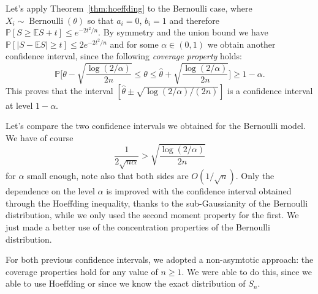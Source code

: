 \documentclass[
	fontsize=11pt, %
	twoside=false, %
	numbers=noenddot, %
]{kaobook}
\DeclareMathOperator{\ber}{Bernoulli}
\renewcommand{\P}{\mathbb P}
\newcommand{\E}{\mathbb E}
\newcommand{\wh}{\widehat}
\begin{document}
Let's apply Theorem~\ref{thm:hoeffding} to the Bernoulli case, where $X_i \sim \ber(\theta)$ so that $a_i = 0$, $b_i = 1$ and therefore $\P[ S \geq \E S + t] \leq e^{-2 t^2 / n}$.
By symmetry and the union bound we have $\P[ | S - \E S | \geq t] \leq 2 e^{-2 t^2 / n}$ and for some $\alpha \in (0, 1)$ we obtain another confidence interval, since the following \emph{coverage property} holds:
\begin{equation*}
	\P \Big[ \theta - \sqrt{\frac{\log(2 / \alpha)}{2n}} \leq \theta \leq \wh \theta 
	+ \sqrt{\frac{\log(2 / \alpha)}{2n}} \Big] \geq 1 - \alpha.
\end{equation*}
This proves that the interval $[\wh \theta \pm \sqrt{\log(2 / \alpha) / (2n)}]$ is a confidence interval at level $1 - \alpha$.

Let's compare the two confidence intervals we obtained for the Bernoulli model.
We have of course
\begin{equation*}
	\frac{1}{2 \sqrt{n \alpha}} > \sqrt{\frac{\log(2 / \alpha)}{2n}} 
\end{equation*}
for $\alpha$ small enough, note also that both sides are $O(1 / \sqrt n)$.
Only the dependence on the level $\alpha$ is improved with the confidence interval obtained through the Hoeffding inequality, thanks to the sub-Gaussianity of the Bernoulli distribution, while we only used the second moment property for the first.
We just made a better use of the concentration properties of the Bernoulli distribution.

For both previous confidence intervals, we adopted a non-asymtotic approach: the coverage properties hold for any value of $n \geq 1$.
We were able to do this, since we able to use Hoeffding or since we know the exact distribution of $S_n$.
\end{document}
